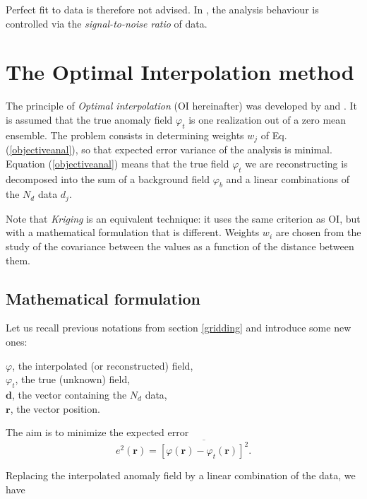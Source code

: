 Perfect fit to data is therefore not advised. In \diva, the analysis behaviour is controlled via the \textit{signal-to-noise ratio} of data.


\section{The Optimal Interpolation method\label{sec:OImethod}}
 
The principle of \textit{Optimal interpolation} (OI hereinafter) was developed by  \cite{GANDIN65} and \cite{BRETHERTON76}. It is assumed that the true anomaly field $\varphi_t$ is one realization out of a zero mean ensemble. The problem consists in determining weights $w_j$ of Eq. (\ref{objectiveanal}), so that expected error variance of the analysis is minimal. Equation (\ref{objectiveanal}) means that the true field $\varphi_t$ we are reconstructing is decomposed into the sum of a background field $\varphi_b$ and a linear combinations of the $N_{d}$ data $d_{j}$.

Note that \textit{Kriging} \citep{KRIGE51,MATHERON63} is an equivalent technique: it uses the same criterion as OI, but with a mathematical formulation that is different. Weights $w_{i}$ are chosen from the study of the covariance between the values as a function of the distance between them.

\subsection{Mathematical formulation}

Let us recall previous notations from section \ref{gridding} and introduce some new ones:

$\varphi$, the interpolated (or reconstructed) field,\\
$\varphi_{t}$, the true (unknown) field,\\
$\mathbf{d}$, the vector containing the $N_{d}$ data,\\
$\mathbf{r}$, the vector position.

The aim is to minimize the expected error
\begin{equation}
e^{2}(\mathbf{r}) = \overline{[\varphi(\mathbf{r})-\varphi_{t}(\mathbf{r})]^{2}}.
\end{equation}

Replacing the interpolated anomaly field by a linear combination of the data, we have 

